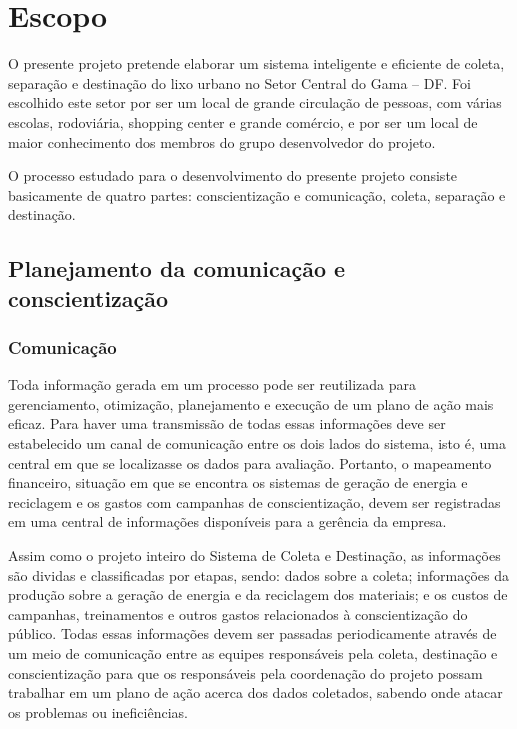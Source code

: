 \section{Escopo}

O presente projeto pretende elaborar um sistema inteligente
 e eficiente de coleta, separação e destinação do lixo
 urbano no Setor Central do Gama – DF. Foi escolhido este
  setor por ser um local de grande circulação de pessoas,
  com várias escolas, rodoviária, shopping center e grande
  comércio, e por ser um local de maior conhecimento dos membros
  do grupo desenvolvedor do projeto.

  O processo estudado para o desenvolvimento do presente projeto
   consiste basicamente de quatro partes: conscientização e comunicação,
   coleta, separação e destinação.

   \subsection{Planejamento da comunicação e conscientização}

   \subsubsection{Comunicação}

   Toda informação gerada em um processo pode ser reutilizada para gerenciamento, otimização, planejamento e execução de um plano de ação mais eficaz. Para haver uma transmissão de todas essas informações deve ser estabelecido um canal de comunicação entre os dois lados do sistema, isto é, uma central em que se localizasse os dados para avaliação. Portanto, o mapeamento financeiro, situação em que se encontra os sistemas de geração de energia e reciclagem e os gastos com campanhas de conscientização, devem ser registradas em uma central de informações disponíveis para a gerência da empresa.

   Assim como o projeto inteiro do Sistema de Coleta e Destinação, as informações são dividas e classificadas por etapas, sendo: dados sobre a coleta; informações da produção sobre a geração de energia e da reciclagem dos materiais; e os custos de campanhas, treinamentos e outros gastos relacionados à conscientização do público. Todas essas informações devem ser passadas periodicamente através de um meio de comunicação entre as equipes responsáveis pela coleta, destinação e conscientização para que os responsáveis pela coordenação do projeto possam trabalhar em um plano de ação acerca dos dados coletados, sabendo onde atacar os problemas ou ineficiências.


